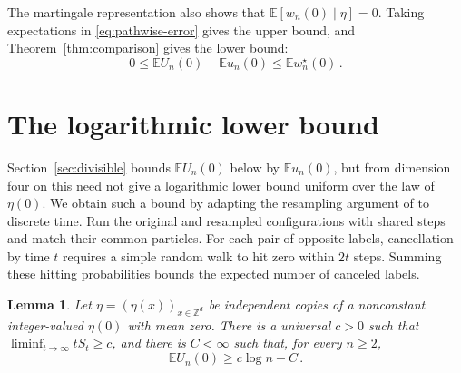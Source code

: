\documentclass[11pt]{amsart}
\theoremstyle{plain}
\newtheorem{lemma}[theorem]{Lemma}
\theoremstyle{definition}
\newcommand{\Z}{\mathbb{Z}}
\newcommand{\E}{\mathbb{E}}
\begin{document}
The martingale representation also shows that $\E[w_n(0)\mid\eta]=0$. Taking
expectations in \eqref{eq:pathwise-error} gives the upper bound, and
Theorem~\ref{thm:comparison} gives the lower bound:
\[
	0\leq\E U_n(0)-\E u_n(0)\leq\E w_n^\star(0)\,.
\]

\section{The logarithmic lower bound}\label{sec:critical}

Section~\ref{sec:divisible} bounds $\E U_n(0)$ below by $\E u_n(0)$, but from
dimension four on this need not give a logarithmic lower bound uniform over the
law of $\eta(0)$. We obtain such a bound by adapting the resampling argument of
\citet{CRS} to discrete time. Run the original and resampled configurations
with shared steps and match their common particles. For each pair of opposite
labels, cancellation by time $t$ requires a simple random walk to hit zero
within $2t$ steps. Summing these hitting probabilities bounds the expected
number of canceled labels.

\begin{lemma}\label{lem:critical-density}
	Let $\eta=(\eta(x))_{x\in\Z^d}$ be independent copies of a nonconstant integer-valued
	$\eta(0)$ with mean zero. There is a universal $c>0$ such that
	$\liminf_{t\to\infty}tS_t\geq c$, and there is
	$C<\infty$ such that, for every $n\geq2$,
	\begin{equation}\label{eq:q-lower-log}
		\E U_n(0)\geq c\log n-C\,.
	\end{equation}
\end{lemma}
\end{document}

